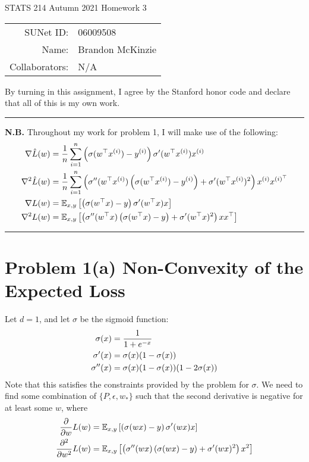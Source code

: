 \documentclass[11pt]{article}
\newcommand{\1}{\mathbb{I}} %
\begin{document}
	
	\begin{center}
		{\Large STATS 214 Autumn 2021 Homework 3}
		
		\begin{tabular}{rl}
			SUNet ID: & 06009508 \\
			Name: & Brandon McKinzie \\
			Collaborators: & N/A
		\end{tabular}
	\end{center}
	
	\p By turning in this assignment, I agree by the Stanford honor code and declare
	that all of this is my own work.
	
	\rule{\linewidth}{0.4pt}
	
	

\textbf{N.B.} Throughout my work for problem 1, I will make use of the following:
\begin{align}
	\nabla \hat L(w)
		&=\inv{n} \insum  \lr{\sigma(w^\top \ival[i]{x}) - \ival[i]{y}}  \sigma'(w^\top \ival[i]{x}) \ival[i]{x} \label{eq:1-gradlhat} \\
	\nabla^2 \hat L(w) 
		&= \inv{n} \insum \lr{\sigma''(w^\top \ival[i]{x}) \lr{\sigma(w^\top \ival[i]{x}) - \ival[i]{y}}  + \sigma'(w^\top \ival[i]{x})^2} \ival[i]{x} x^{(i)^\top} \label{eq:1-hessianlhat} \\
	\nabla L(w)
		&=\E[x,y]{ \lr{\sigma(w^\top x) - y}  \sigma'(w^\top x) x } \label{eq:1-gradl} \\
	\nabla^2 L(w) 
		&= \E[x,y]{\lr{\sigma''(w^\top x) \lr{\sigma(w^\top x) - y}  + \sigma'(w^\top x)^2} x x^\top} \label{eq:1-hessianl}
\end{align} 

\hrule 


\section*{Problem 1(a) Non-Convexity of the Expected Loss}


Let $d = 1$, and let $\sigma$ be the sigmoid function:
\begin{align}
	\sigma(x) 	
		&= \inv{1 + e^{-x}} \\
	\sigma'(x)
		&= \sigma(x) (1 - \sigma(x)) \\
	\sigma''(x)
		&= \sigma(x) (1 - \sigma(x)) (1 - 2\sigma(x))
\end{align}
Note that this satisfies the constraints provided by the problem for $\sigma$. We need to find some combination of $\{ P, \epsilon, w_* \}$ such that the second derivative is negative for at least some $w$, where
\begin{align}
	\pderiv{}{w} L(w)
		&= \E[x,y]{\lr{ \sigma(wx) - y} \sigma'(wx) x}	\\
	\ppderiv{}{w} L(w)
		&= \E[x,y]{\lr{ \sigma''(wx) \lr{\sigma(wx) - y} + \sigma'(wx)^2   } x^2 }
\end{align}
\end{document}
